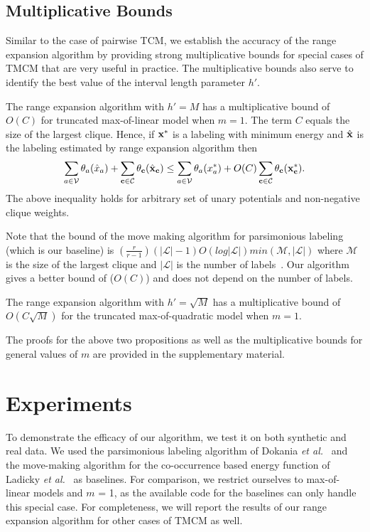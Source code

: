 \documentclass[runningheads]{llncs}
\newcommand{\mysection}[1]{\vspace{-2mm}\section{#1}\vspace{-2mm}}
\newcommand{\mysubsection}[1]{\vspace{-1mm}\subsection{#1}\vspace{-1mm}}
\begin{document}
\mysubsection{Multiplicative Bounds}
\label{subsec:bounds}
Similar to the case of pairwise TCM, we establish the accuracy of the range expansion algorithm
by providing strong multiplicative bounds for special cases of TMCM that are very useful in practice. The multiplicative bounds also serve to identify the best value
of the interval length parameter $h'$.

\begin{proposition}
\label{prop:linearBound}
The range expansion algorithm with $h' = M$ has a multiplicative bound of $O(C)$ for truncated max-of-linear model when $m=1$. The
term $C$ equals the size of the largest clique. Hence, if ${\bf x}^*$ is a labeling with
minimum energy and $\hat{\bf x}$ is the labeling estimated by range expansion algorithm then
\begin{equation}
\small
\sum_{a \in {\cal V}} \theta_a(\hat{x}_a) + \sum_{{\bf c} \in {\cal C}} \theta_{\bf c}(\hat{\bf x}_{\bf c}) \leq \nonumber 
\sum_{a \in {\cal V}} \theta_a({x}^*_a) + O(C) \sum_{{\bf c} \in {\cal C}} \theta_{\bf c}({\bf x}^*_{\bf c}).
\label{eq:linear_bound}
\end{equation}
The above inequality holds for arbitrary set of unary potentials and non-negative clique weights.
\end{proposition}
Note that the bound of the move making algorithm for parsimonious labeling (which is our baseline) is $\left(\frac{r}{r-1}\right) (|\mathcal{L}| - 1) O(log|\mathcal{L}|)min(\mathcal{M}, |\mathcal{L}|)$ where $\mathcal{M}$ is the size of the largest clique and $|\mathcal{L}|$ is the number of labels~\cite{dokaniaiccv15}. Our algorithm gives a better bound of ($O(C)$) and does not depend on the number of labels.

\begin{proposition}
\label{prop:quadraticBound}
The range expansion algorithm with $h' = \sqrt{M}$ has a multiplicative bound of $O(C\sqrt{M})$ for the truncated max-of-quadratic model when $m=1$.
\end{proposition}
The proofs for the above two propositions as well as the multiplicative bounds for general values
of $m$ are provided in the supplementary material.

\mysection{Experiments} 

To demonstrate the efficacy of our algorithm, we test it on both synthetic and real data. We used the parsimonious labeling algorithm of Dokania \textit{et al.}~\cite{dokaniaiccv15} and the move-making algorithm for the co-occurrence based energy function of Ladicky \textit{et al.}~\cite{ladickyeccv10} as baselines. For comparison, we restrict ourselves to max-of-linear models and $m$ = 1, as the available code for the baselines can only handle this special case. For completeness, we will report the results of our range expansion algorithm for other cases of TMCM as well.
\end{document}
